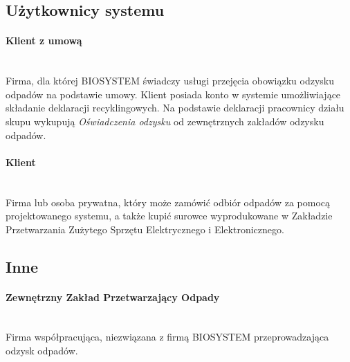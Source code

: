 \subsection{Użytkownicy systemu}

	\paragraph{Klient z umową}\ \\
	Firma, dla której BIOSYSTEM świadczy usługi przejęcia obowiązku odzysku odpadów na podstawie umowy. Klient posiada konto w systemie umożliwiające składanie deklaracji recyklingowych. Na podstawie deklaracji pracownicy działu skupu wykupują \emph{Oświadczenia odzysku} od zewnętrznych zakładów odzysku odpadów.

	\paragraph{Klient} \ \\
	Firma lub osoba prywatna, który może zamówić odbiór odpadów za pomocą projektowanego systemu, a także kupić surowce wyprodukowane w Zakładzie Przetwarzania Zużytego Sprzętu Elektrycznego i Elektronicznego.

\subsection{Inne}
	\paragraph{Zewnętrzny Zakład Przetwarzający Odpady} \ \\
	Firma współpracująca, niezwiązana z firmą BIOSYSTEM przeprowadzająca odzysk odpadów.
